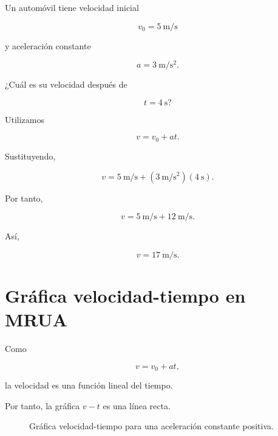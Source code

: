 \begin{ejemplo}

Un automóvil tiene velocidad inicial

\[ v_0=\SI{5}{\meter\per\second} \]

y aceleración constante

\[ a=\SI{3}{\meter\per\second\squared}. \]

¿Cuál es su velocidad después de

\[ t=\SI{4}{\second}? \]

Utilizamos

\[ v=v_0+at. \]

Sustituyendo,

\[
v
=
\SI{5}{\meter\per\second}
+
\left(\SI{3}{\meter\per\second\squared}\right)
\left(\SI{4}{\second}\right).
\]

Por tanto,

\[
v
=
\SI{5}{\meter\per\second}
+
\SI{12}{\meter\per\second}.
\]

Así,

\[ \boxed{v=\SI{17}{\meter\per\second}}. \]
\end{ejemplo}


\section{Gráfica velocidad-tiempo en MRUA}

Como

\[ v=v_0+at, \]

la velocidad es una función lineal del tiempo.

Por tanto, la gráfica \(v-t\) es una línea recta.

\begin{figure}[H]
    \centering


    \caption{Gráfica velocidad-tiempo para una aceleración constante positiva.}
\end{figure}

